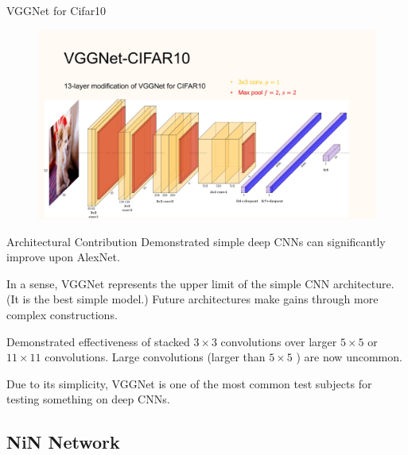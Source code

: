 \begin{frame}[allowframebreaks]

\begin{mydefinitionblock}{7.9}{VGGNet for Cifar10}
    \begin{figure}[H]
        \centering
        \includegraphics[width=1.0\textwidth]{.././assets/7.9.jpg}
    \end{figure}
\end{mydefinitionblock}

\end{frame}

\begin{frame}[allowframebreaks]

\begin{myconceptblock}{7.10}{Architectural Contribution}
    Demonstrated simple deep CNNs can significantly improve upon AlexNet.

    In a sense, VGGNet represents the upper limit of the simple CNN architecture. (It is the best simple model.) Future architectures make gains through more complex constructions.

    Demonstrated effectiveness of stacked $3 \times 3$ convolutions over larger $5 \times 5$ or $11 \times 11$ convolutions. Large convolutions (larger than $5 \times 5$ ) are now uncommon.

    Due to its simplicity, VGGNet is one of the most common test subjects for testing something on deep CNNs.
\end{myconceptblock}

\end{frame}

\subsection{NiN Network}

